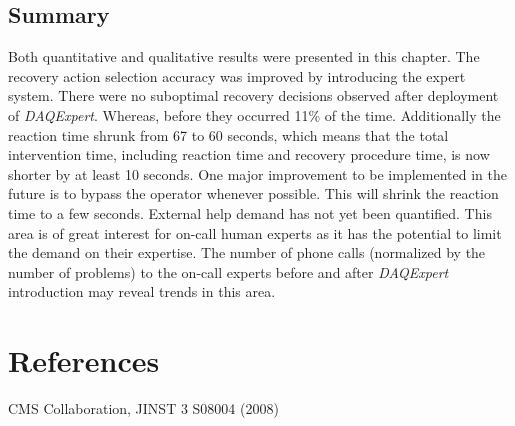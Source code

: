 \documentclass[a4paper]{jpconf}
\begin{document}
\subsection{Summary}
Both quantitative and qualitative results were presented in this chapter. The recovery action selection accuracy was improved by introducing the expert system. There were no suboptimal recovery decisions observed after deployment of {\it DAQExpert}. Whereas, before they occurred 11\% of the time. Additionally the reaction time shrunk from 67 to 60 seconds, which means that the total intervention time, including reaction time and recovery procedure time, is now shorter by at least 10 seconds. One major improvement to be implemented in the future is to bypass the operator whenever possible. This will shrink the reaction time to a few seconds.
External help demand has not yet been quantified. This area is of great interest for on-call human experts as it has the potential to limit the demand on their expertise. The number of phone calls (normalized by the number of problems) to the on-call experts before and after {\it DAQExpert} introduction may reveal trends in this area.


\section*{References}
\begin{thebibliography}{9}

 CMS Collaboration, JINST 3 S08004 (2008)
\end{thebibliography}
\end{document}
